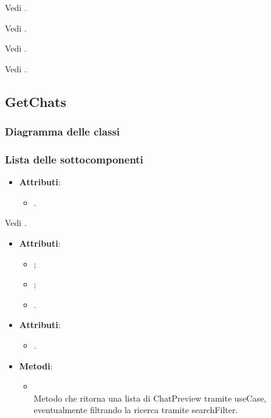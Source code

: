 \documentclass[10pt, a4paper]{article}
\begin{document}
Vedi .


Vedi .

Vedi .

Vedi .





\subsection{GetChats}
\subsubsection{Diagramma delle classi}
\subsubsection{Lista delle sottocomponenti}

\label{ChatFilterDettaglio}
\begin{itemize}
    \item \textbf{Attributi}:
    \begin{itemize}
        \item {}.
    \end{itemize}
\end{itemize}

Vedi .


\label{ChatPreviewDettaglio}
\begin{itemize}
    \item \textbf{Attributi}:
    \begin{itemize}
        \item {};
        \item {};
        \item {}.
    \end{itemize}
\end{itemize}



\label{GetChatsControllerDettaglio}
\begin{itemize}
    \item \textbf{Attributi}:
    \begin{itemize}
        \item {}.
    \end{itemize}
    \item \textbf{Metodi}:
    \begin{itemize}
        \item {}\\
        Metodo che ritorna una lista di ChatPreview tramite useCase, eventualmente filtrando la ricerca tramite searchFilter. 
    \end{itemize}
\end{itemize}
\end{document}
